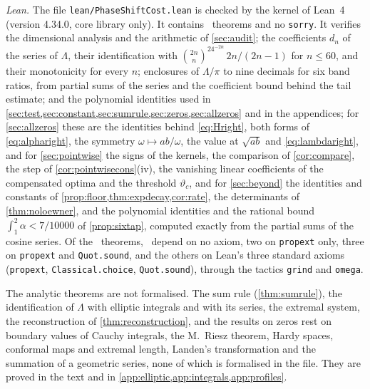 \emph{Lean.} The file \texttt{lean/PhaseShiftCost.lean} is checked by the
kernel of Lean~4 (version 4.34.0, core library only). It contains
\leancount\ theorems and no \texttt{sorry}. It verifies the dimensional
analysis and the arithmetic of \cref{sec:audit}; the coefficients $d_n$ of
the series of $\Lambda$, their identification with
$\binom{2n}n^24^{-2n}\,2n/(2n-1)$ for $n\le60$, and their monotonicity for
every $n$; enclosures of $\Lambda/\pi$ to nine decimals for six band ratios,
from partial sums of the series and the coefficient bound behind the tail
estimate; and the polynomial identities used in
\cref{sec:test,sec:constant,sec:sumrule,sec:zeros,sec:allzeros} and in the
appendices; for \cref{sec:allzeros} these are the identities behind
\eqref{eq:Hright}, both forms of \eqref{eq:alpharight}, the symmetry
$\omega\mapsto ab/\omega$, the value at $\sqrt{ab}$ and \eqref{eq:lambdaright},
and for \cref{sec:pointwise} the signs of the kernels, the comparison of
\cref{cor:compare}, the step of \cref{cor:pointwisecons}(iv), the vanishing
linear coefficients of the compensated optima and the threshold
$\vartheta_c$, and for \cref{sec:beyond} the identities and constants of
\cref{prop:floor,thm:expdecay,cor:rate}, the determinants of
\cref{thm:noloewner}, and the polynomial identities and the rational bound
$\int_1^2\alpha<7/10000$ of \cref{prop:sixtap}, computed exactly from the
partial sums of the cosine series. Of the \leancount\ theorems, \leanfree\ depend on no axiom, two on
\texttt{propext} only, three on \texttt{propext} and \texttt{Quot.sound}, and the others on Lean's three standard axioms
(\texttt{propext}, \texttt{Classical.choice}, \texttt{Quot.sound}), through
the tactics \texttt{grind} and \texttt{omega}.

The analytic theorems are not formalised. The sum rule
(\cref{thm:sumrule}), the identification of $\Lambda$ with elliptic integrals
and with its series, the extremal system, the reconstruction of
\cref{thm:reconstruction}, and the results on zeros rest on
boundary values of Cauchy integrals, the M.~Riesz theorem, Hardy spaces,
conformal maps and extremal length, Landen's
transformation and the summation of a geometric series, none of which is
formalised in the file. They are proved in the text and in
\cref{app:elliptic,app:integrals,app:profiles}.
